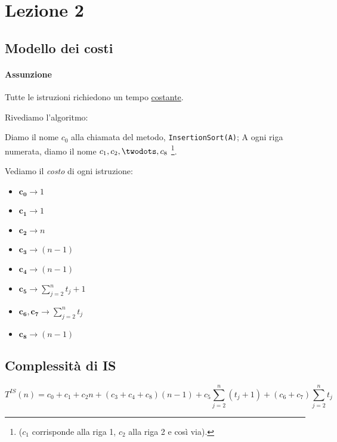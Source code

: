 \section{Lezione 2}

\subsection{Modello dei costi}
\paragraph{Assunzione} Tutte le istruzioni richiedono un tempo \underline{costante}.

Rivediamo l'algoritmo:



Diamo il nome $c_0$ alla chiamata del metodo, \texttt{InsertionSort(A)};
A ogni riga numerata, diamo il nome $c_1, c_2,\twodots ,c_8$
\footnote{($c_1$ corrisponde alla riga 1, $c_2$ alla riga 2 e così via).}.\par
Vediamo il \emph{costo} di ogni istruzione:

\begin{itemize}
    \item[] $\boldsymbol{c_0} \rightarrow 1$
    \item[] $\boldsymbol{c_1} \rightarrow 1$
    \item[] $\boldsymbol{c_2} \rightarrow n$
    \item[] $\boldsymbol{c_3} \rightarrow (n-1)$
    \item[] $\boldsymbol{c_4} \rightarrow (n-1)$
    \item[] $\boldsymbol{c_5} \rightarrow \displaystyle\sum_{j=2}^{n} t_j+1$
    \item[] $\boldsymbol{c_6}, \boldsymbol{c_7} \rightarrow \displaystyle\sum_{j=2}^{n} t_j$
    \item[] $\boldsymbol{c_8} \rightarrow (n-1)$
\end{itemize}

\subsection{Complessità di IS} \label{is:complessita}
\begin{displaymath}
    T^{IS}(n) = c_0 + c_1 + c_2n + (c_3+c_4+c_8)(n-1)
    + c_5\displaystyle\sum_{j=2}^{n}(t_j+1) + (c_6+c_7)\displaystyle\sum_{j=2}^{n}t_j
\end{displaymath}

